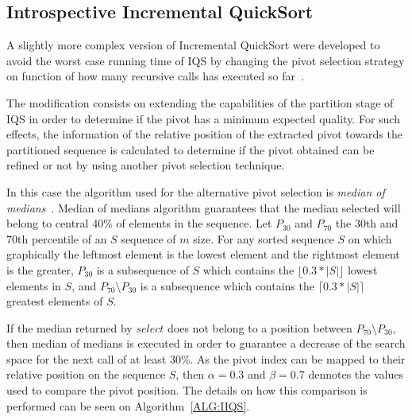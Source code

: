 \subsection{Introspective Incremental QuickSort}

A slightly more complex version of Incremental QuickSort were developed to avoid the worst case running time of IQS by changing the pivot selection strategy on function of how many recursive calls has executed so far~\cite{7416566}.

The modification consists on extending the capabilities of the partition stage of IQS in order to determine if the pivot has a minimum expected quality. For such effects, the information of the relative position of the extracted pivot towards the partitioned sequence is calculated to determine if the pivot obtained can be refined or not by using another pivot selection technique.

In this case the algorithm used for the alternative pivot selection is \textit{median of medians}~\cite{Blum_Floyd_Pratt_Rivest_Tarjan_1973}. Median of medians algorithm guarantees that the median selected will belong to central 40\% of elements in the sequence. Let $P_{30}$ and $P_{70}$ the 30th and 70th percentile of an $S$ sequence of $m$ size. For any sorted sequence $S$ on which graphically the leftmost element is the lowest element and the rightmost element is the greater, $P_{30}$ is a subsequence of $S$ which contains the $\lfloor0.3*|S|\rfloor$ lowest elements in $S$, and $P_{70} \setminus P_{30}$ is a subsequence which contains the $\lceil0.3*|S|\rceil$ greatest elements of $S$. 

If the median returned by $select$ does not belong to a position between $P_{70} \setminus P_{30}$, then median of medians is executed in order to guarantee a decrease of the search space for the next call of at least 30\%. As the pivot index can be mapped to their relative position on the sequence $S$, then $\alpha=0.3$ and $\beta=0.7$ dennotes the values used to compare the pivot position. The details on how this comparison is performed can be seen on Algorithm~\ref{ALG:IIQS}.


